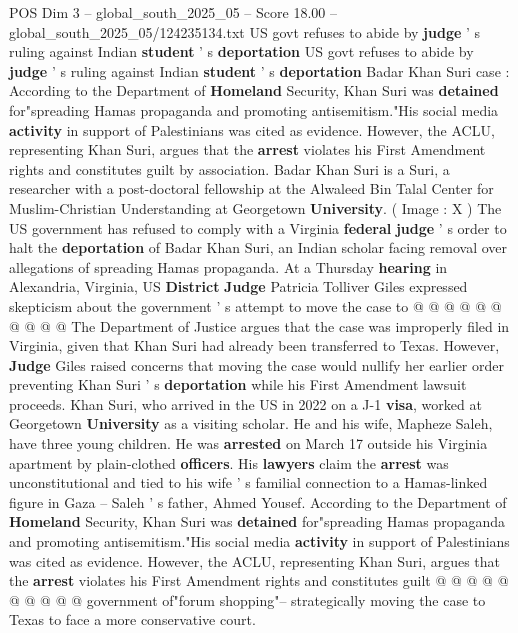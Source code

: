 \begin{textsample}{POS Dim 3 – global\_south\_2025\_05 – Score 18.00 – global\_south\_2025\_05/124235134.txt}  \label{ex:f3_pos_238}
US govt refuses to abide by \textbf{judge} ' s ruling against Indian \textbf{student} ' s \textbf{deportation} US govt refuses to abide by \textbf{judge} ' s ruling against Indian \textbf{student} ' s \textbf{deportation} Badar Khan Suri case : According to the Department of \textbf{Homeland} Security, Khan Suri was \textbf{detained} for"spreading Hamas propaganda and promoting antisemitism."His social media \textbf{activity} in support of Palestinians was cited as evidence.
However, the ACLU, representing Khan Suri, argues that the \textbf{arrest} violates his First Amendment rights and constitutes guilt by association.
Badar Khan Suri is a Suri, a researcher with a post-doctoral fellowship at the Alwaleed Bin Talal Center for Muslim-Christian Understanding at Georgetown \textbf{University}. ( Image : X ) The US government has refused to comply with a Virginia \textbf{federal} \textbf{judge} ' s order to halt the \textbf{deportation} of Badar Khan Suri, an Indian scholar facing removal over allegations of spreading Hamas propaganda.
At a Thursday \textbf{hearing} in Alexandria, Virginia, US \textbf{District} \textbf{Judge} Patricia Tolliver Giles expressed skepticism about the government ' s attempt to move the case to @ @ @ @ @ @ @ @ @ @ The Department of Justice argues that the case was improperly filed in Virginia, given that Khan Suri had already been transferred to Texas.
However, \textbf{Judge} Giles raised concerns that moving the case would nullify her earlier order preventing Khan Suri ' s \textbf{deportation} while his First Amendment lawsuit proceeds.
Khan Suri, who arrived in the US in 2022 on a J-1 \textbf{visa}, worked at Georgetown \textbf{University} as a visiting scholar.
He and his wife, Mapheze Saleh, have three young children.
He was \textbf{arrested} on March 17 outside his Virginia apartment by plain-clothed \textbf{officers}.
His \textbf{lawyers} claim the \textbf{arrest} was unconstitutional and tied to his wife ' s familial connection to a Hamas-linked figure in Gaza -- Saleh ' s father, Ahmed Yousef.
According to the Department of \textbf{Homeland} Security, Khan Suri was \textbf{detained} for"spreading Hamas propaganda and promoting antisemitism."His social media \textbf{activity} in support of Palestinians was cited as evidence.
However, the ACLU, representing Khan Suri, argues that the \textbf{arrest} violates his First Amendment rights and constitutes guilt @ @ @ @ @ @ @ @ @ @ government of"forum shopping"-- strategically moving the case to Texas to face a more conservative court.

\end{textsample}

